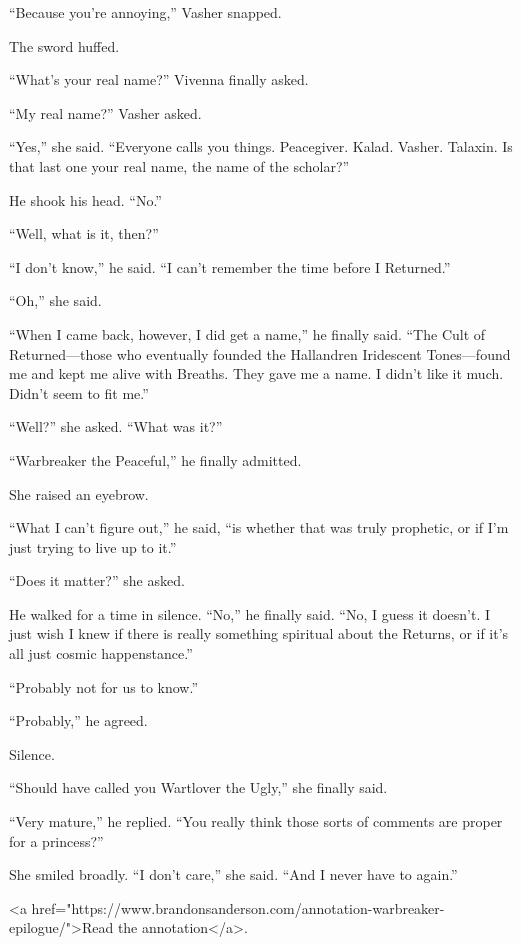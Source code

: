 “Because you’re annoying,” Vasher snapped.

The sword huffed.

“What’s your real name?” Vivenna finally asked.

“My real name?” Vasher asked.

“Yes,” she said. “Everyone calls you things. Peacegiver. Kalad. Vasher. Talaxin. Is that last one your real name, the name of the scholar?”

He shook his head. “No.”

“Well, what is it, then?”

“I don’t know,” he said. “I can’t remember the time before I Returned.”

“Oh,” she said.

“When I came back, however, I did get a name,” he finally said. “The Cult of Returned—those who eventually founded the Hallandren Iridescent Tones—found me and kept me alive with Breaths. They gave me a name. I didn’t like it much. Didn’t seem to fit me.”

“Well?” she asked. “What was it?”

“Warbreaker the Peaceful,” he finally admitted.

She raised an eyebrow.

“What I can’t figure out,” he said, “is whether that was truly prophetic, or if I’m just trying to live up to it.”

“Does it matter?” she asked.

He walked for a time in silence. “No,” he finally said. “No, I guess it doesn’t. I just wish I knew if there is really something spiritual about the Returns, or if it’s all just cosmic happenstance.”

“Probably not for us to know.”

“Probably,” he agreed.

Silence.

“Should have called you Wartlover the Ugly,” she finally said.

“Very mature,” he replied. “You really think those sorts of comments are proper for a princess?”

She smiled broadly. “I don’t care,” she said. “And I never have to again.”

<a href="https://www.brandonsanderson.com/annotation-warbreaker-epilogue/">Read the annotation</a>.

